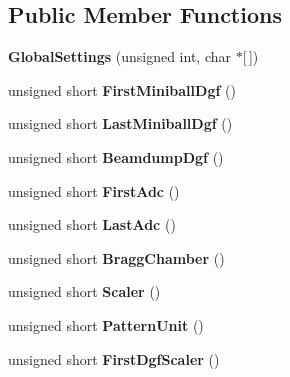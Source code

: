 \subsection*{Public Member Functions}
\begin{DoxyCompactItemize}
\item 
\mbox{\label{class_global_settings_a1c225d218e6d03979215f1a6204b7f4e}} 
{\bfseries Global\+Settings} (unsigned int, char $\ast$\mbox{[}$\,$\mbox{]})
\item 
\mbox{\label{class_global_settings_a52a1e1677bc201c6b39835356293d85d}} 
unsigned short {\bfseries First\+Miniball\+Dgf} ()
\item 
\mbox{\label{class_global_settings_aaadd8c6a7a474f0b9553ba19188eb264}} 
unsigned short {\bfseries Last\+Miniball\+Dgf} ()
\item 
\mbox{\label{class_global_settings_af0ff7c615f313cb54022cf6b5ddcdd23}} 
unsigned short {\bfseries Beamdump\+Dgf} ()
\item 
\mbox{\label{class_global_settings_ad422d73434ae2ccc7b26ffed75d4f569}} 
unsigned short {\bfseries First\+Adc} ()
\item 
\mbox{\label{class_global_settings_a0b452889afe332aad1be1e9a74b58f4d}} 
unsigned short {\bfseries Last\+Adc} ()
\item 
\mbox{\label{class_global_settings_a5590e2efb7c185568d151cb7172b58bc}} 
unsigned short {\bfseries Bragg\+Chamber} ()
\item 
\mbox{\label{class_global_settings_ac68f6e40bcec64f60cbdff06de507771}} 
unsigned short {\bfseries Scaler} ()
\item 
\mbox{\label{class_global_settings_a039a4d8e7a31e0c29f555ac862bd249f}} 
unsigned short {\bfseries Pattern\+Unit} ()
\item 
\mbox{\label{class_global_settings_a216b8164c02a1de1d5437df565cb9485}} 
unsigned short {\bfseries First\+Dgf\+Scaler} ()

\end{DoxyCompactItemize}
